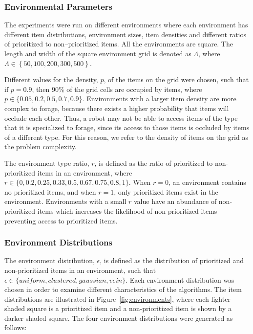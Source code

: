 \documentclass[preprint,12pt]{elsarticle}
\begin{document}
\subsubsection{Environmental Parameters}
\label{environmentalparameters}
The experiments were run on different environments where each environment has different item distributions, environment sizes, item densities and different ratios of prioritized to non--prioritized items. All the environments are square. The length and width of the square environment grid is denoted as $\Lambda$, where $\Lambda\in \left\{ 50, 100, 200, 300, 500\right\}$.

Different values for the density, $p$, of the items on the grid were chosen, such that if $p=0.9$, then 90\% of the grid cells are occupied by items, where $p\in \{ 0.05,\allowbreak 0.2,\allowbreak 0.5,\allowbreak 0.7,\allowbreak 0.9\}$. Environments with a larger item density are more complex to forage, because there exists a higher probability that items will occlude each other. Thus, a robot may not be able to access items of the type that it is specialized to forage, since its access to those items is occluded by items of a different type. For this reason, we refer to the density of items on the grid as the problem complexity.

The environment type ratio, $r$, is defined as the ratio of prioritized to non-prioritized items in an environment, where $r\in \{0,\allowbreak 0.2,\allowbreak 0.25,\allowbreak 0.33,\allowbreak 0.5,\allowbreak 0.67,\allowbreak 0.75,\allowbreak 0.8, 1\}$. When $r=0$, an environment contains no prioritized items, and when $r=1$, only prioritized items exist in the environment. Environments with a small $r$ value have an abundance of non-prioritized items which increases the likelihood of non-prioritized items preventing access to prioritized items.

\subsubsection{Environment Distributions}
\label{environmentdistributions}
The environment distribution, $\epsilon$, is defined as the distribution of prioritized and non-prioritized items in an environment, such that $\epsilon\in\{uniform, clustered, gaussian, vein\}$. Each environment distribution was chosen in order to examine different characteristics of the algorithms. The item distributions are illustrated in Figure~\ref{fig:environments}, where each lighter shaded square is a prioritized item and a non-prioritized item is shown by a darker shaded square. The four environment distributions were generated as follows:
\end{document}
